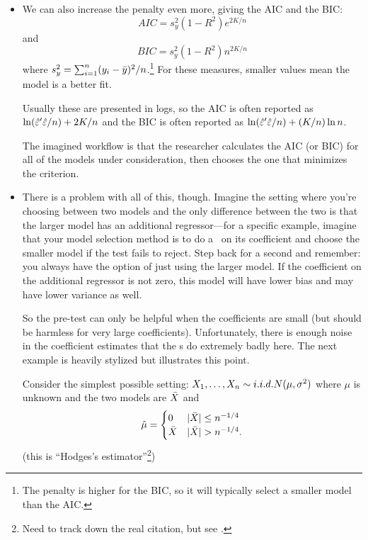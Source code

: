 \begin{itemize}[leftmargin=0pt]
\item We can also increase the penalty even more, giving the AIC and
  the BIC:
  \begin{equation*}
    AIC = s^2_y (1 - R^2) e^{2K/n}
  \end{equation*}
  and
  \begin{equation*}
    BIC = s^2_y (1 - R^2) n^{2K/n}
  \end{equation*}
  where $s_y^2 = \sum_{i=1}^n (y_i - \bar{y})^2 / n$.\footnote{The penalty
    is higher for the BIC, so it will typically select a smaller model
    than the AIC.}
  For these measures, smaller values mean the model is a better fit.

  Usually these are presented in logs, so the AIC is often reported as
  $\ln(\hat{\varepsilon}'\hat{\varepsilon}/n) + 2K/n$ and the BIC is often reported as
  $\ln(\hat{\varepsilon}'\hat{\varepsilon}/n) + (K/n) \ln n$.

  The imagined workflow is that the researcher calculates the AIC (or
  BIC) for all of the models under consideration, then chooses the one
  that minimizes the criterion.

\item There is a problem with all of this, though.  Imagine the
  setting where you're choosing between two models and the only
  difference between the two is that the larger model has an
  additional regressor---for a specific example, imagine that your
  model selection method is to do a \ttest\ on its coefficient and
  choose the smaller model if the test fails to reject.  Step back for
  a second and remember: you always have the option of just using the
  larger model.  If the coefficient on the additional regressor is not
  zero, this model will have lower bias and may have lower variance as
  well.

  So the pre-test can only be helpful when the coefficients are small
  (but should be harmless for very large coefficients).
  Unfortunately, there is enough noise in the coefficient estimates
  that the \ttest s do extremely badly here.  The next example is
  heavily stylized but illustrates this point.

  \begin{ex}
    Consider the simplest possible setting: $X_1,\dots,X_n \sim i.i.d.
    N(\mu,\sigma^2)$ where $\mu$ is unknown and the two models are
    $\bar{X}$ and
    \begin{equation*}
      \hat{\mu} =
      \begin{cases}
        0   & |\bar{X}| \leq n^{-1/4} \\
        \bar{X} & |\bar{X}| > n^{-1/4}.
      \end{cases}
    \end{equation*}
    (this is ``Hodges's estimator''\footnote{Need to track down the
      real citation, but see \citet{LP08}.})


\end{ex}
\end{itemize}
